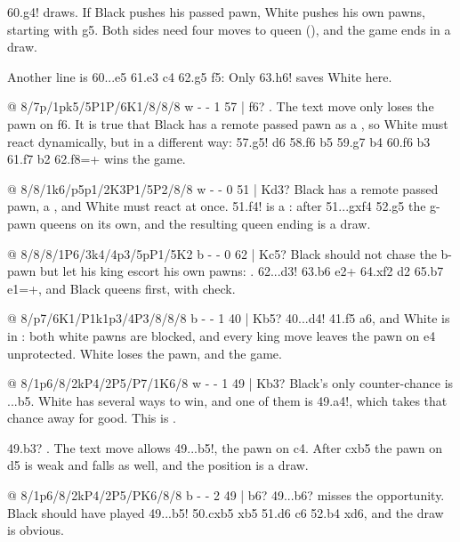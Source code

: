 60.g4! draws. If Black pushes his passed pawn, White pushes his own pawns, starting with g5.
Both sides need four moves to queen (), and the
game ends in a draw.

Another line is 60...\K e5 61.\K e3 c4 62.g5 \K f5:
Only 63.h6! saves White here.

@ 8/7p/1pk5/5P1P/6K1/8/8/8 w - - 1 57 | f6?
. The text move only loses the pawn on
f6. It is true that Black has a remote passed pawn as a ,
so White must react dynamically, but in a different way: 57.\K g5! \K d6 58.\K f6 b5 59.\K g7 b4
60.f6 b3 61.f7 b2 62.f8=\Q+ wins the game.

@ 8/8/1k6/p5p1/2K3P1/5P2/8/8 w - - 0 51 | Kd3?
Black has a remote passed pawn, a , and
White must react at once. 51.f4! is a
: after 51...gxf4 52.g5 the g-pawn queens on its
own, and the resulting queen ending is a draw.

@ 8/8/8/1P6/3k4/4p3/5pP1/5K2 b - - 0 62 | Kc5?
Black should not chase the b-pawn but let his king escort his own pawns:
. 62...\K d3! 63.b6 e2+
64.\K xf2 \K d2 65.b7 e1=\Q+, and Black queens first, with check.

@ 8/p7/6K1/P1k1p3/4P3/8/8/8 b - - 1 40 | Kb5?
40...\K d4! 41.\K f5 a6, and White is in :
both white pawns are blocked, and every king move leaves the pawn on e4 unprotected. White loses
the pawn, and the game.

@ 8/1p6/8/2kP4/2P5/P7/1K6/8 w - - 1 49 | Kb3?
Black's only counter-chance is ...b5. White has several ways to win, and one of them is 49.a4!,
which takes that chance away for good. This is
.

49.\K b3? . The text move allows
49...b5!, 
the pawn on c4. After cxb5 the pawn on d5 is weak and falls as well, and the position is a draw.

@ 8/1p6/8/2kP4/2P5/PK6/8/8 b - - 2 49 | b6?
49...b6? misses the opportunity. Black should have played 49...b5! 50.cxb5 \K xb5 51.d6 \K c6
52.\K b4 \K xd6, and the draw is obvious.

